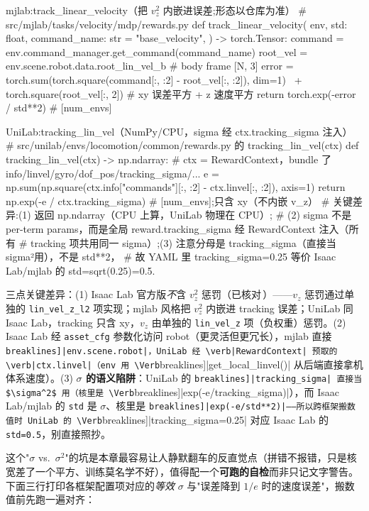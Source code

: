 \begin{codebox}[Python]{mjlab:track\_linear\_velocity（把 $v_z^2$ 内嵌进误差;形态以仓库为准）}
# src/mjlab/tasks/velocity/mdp/rewards.py
def track_linear_velocity(
    env, std: float, command_name: str = "base_velocity",
) -> torch.Tensor:
    command = env.command_manager.get_command(command_name)
    root_vel = env.scene.robot.data.root_lin_vel_b        # body frame [N, 3]
    error = torch.sum(torch.square(command[:, :2] - root_vel[:, :2]), dim=1) \
            + torch.square(root_vel[:, 2])                # xy 误差平方 + z 速度平方
    return torch.exp(-error / std**2)                     # [num_envs]
\end{codebox}

\begin{codebox}[Python]{UniLab:tracking\_lin\_vel（NumPy/CPU，sigma 经 ctx.tracking\_sigma 注入）}
# src/unilab/envs/locomotion/common/rewards.py 的 tracking_lin_vel(ctx)
def tracking_lin_vel(ctx) -> np.ndarray:
    # ctx = RewardContext，bundle 了 info/linvel/gyro/dof_pos/tracking_sigma/...
    e = np.sum(np.square(ctx.info["commands"][:, :2] - ctx.linvel[:, :2]), axis=1)
    return np.exp(-e / ctx.tracking_sigma)   # [num_envs];只含 xy（不内嵌 v_z）
# 关键差异:(1) 返回 np.ndarray（CPU 上算，UniLab 物理在 CPU）;
#   (2) sigma 不是 per-term params，而是全局 reward.tracking_sigma 经 RewardContext 注入（所有
#      tracking 项共用同一 sigma）;(3) 注意分母是 tracking_sigma（直接当 sigma²用），不是 std**2，
#      故 YAML 里 tracking_sigma=0.25 等价 Isaac Lab/mjlab 的 std=sqrt(0.25)=0.5.
\end{codebox}

三点关键差异：(1) Isaac Lab 官方版\emph{不}含 $v_z^2$ 惩罚（已核对\,\cite{isaaclab2024}）——$v_z$ 惩罚通过单独的 \verb|lin_vel_z_l2| 项实现；mjlab 风格把 $v_z^2$ 内嵌进 tracking 误差；UniLab 同 Isaac Lab，tracking 只含 xy，$v_z$ 由单独的 \verb|lin_vel_z| 项（负权重）惩罚。(2) Isaac Lab 经 \verb|asset_cfg| 参数化访问 robot（更灵活但更冗长），mjlab 直接 \Verb[breaklines]|env.scene.robot|，UniLab 经 \verb|RewardContext| 预取的 \verb|ctx.linvel|（env 用 \Verb[breaklines]|get_local_linvel()| 从后端直接拿机体系速度）。(3) \textbf{$\sigma$ 的语义陷阱}：UniLab 的 \Verb[breaklines]|tracking_sigma| 直接当 $\sigma^2$ 用（核里是 \Verb[breaklines]|exp(-e/tracking_sigma)|），而 Isaac Lab/mjlab 的 \verb|std| 是 $\sigma$、核里是 \Verb[breaklines]|exp(-e/std**2)|——所以跨框架搬数值时 UniLab 的 \Verb[breaklines]|tracking_sigma=0.25| 对应 Isaac Lab 的 \verb|std=0.5|，别直接照抄。

这个"$\sigma$ vs.\ $\sigma^2$"的坑是本章最容易让人静默翻车的反直觉点（拼错不报错，只是核宽差了一个平方、训练莫名学不好），值得配一个\textbf{可跑的自检}而非只记文字警告。下面三行打印各框架配置项对应的\emph{等效} $\sigma$ 与"误差降到 $1/e$ 时的速度误差"，搬数值前先跑一遍对齐：

